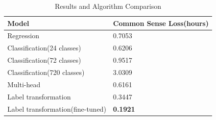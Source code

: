 \documentclass{article}
\begin{document}
    \begin{table}[!ht]
	\caption{Results and Algorithm Comparison}
	\label{tab:performance}
	\centering
	\begin{tabular}{ll}
		\toprule
		\textbf{Model} & \textbf{Common Sense Loss(hours)} \\
		\midrule
		Regression & 0.7053 \\
		Classification(24 classes) & 0.6206 \\
		Classification(72 classes) & 0.9517 \\
		Classification(720 classes) & 3.0309 \\
		Multi-head & 0.6161 \\
		Label transformation & 0.3447 \\
        Label transformation(fine-tuned) & \textbf{0.1921} \\
		\bottomrule
	\end{tabular}
\end{table}
\end{document}
